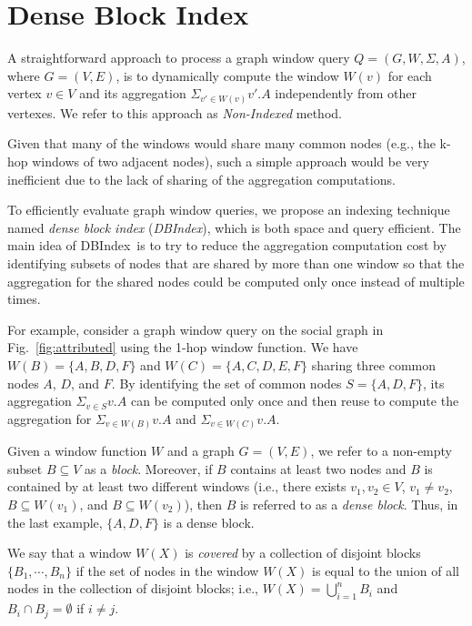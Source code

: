 
\newcommand{\DBIndex}{DBIndex}
\newcommand{\blockset}{{\cal B}}
\newcommand{\clusterset}{{\cal C}}

\section{Dense Block Index}
A straightforward approach to process a graph window query 
$Q = (G, W, \Sigma, A)$, where $G = (V,E)$,
is to dynamically compute the window $W(v)$ for each vertex $v \in V$ and
its aggregation 
$\Sigma_{v' \in W(v)} v'.A$ 
independently from other vertexes. We refer to this approach as \emph{Non-Indexed} method.

Given that many of the windows would share many common nodes (e.g., the k-hop windows of two adjacent nodes),
such a simple approach would be very inefficient due to the lack of sharing of the aggregation computations. 

To efficiently evaluate graph window queries, we propose an indexing technique named \emph{dense block index} (\textit{\DBIndex}), which is both space and query efficient. 
The main idea of \DBIndex\ is to try to reduce the aggregation computation cost by identifying subsets of nodes that are shared by more than one window 
so that the aggregation for the shared nodes could be computed only once instead of multiple times.

For example, consider a graph window query on the social graph in Fig.~\ref{fig:attributed} using the 1-hop window function.
We have $W(B) = \{A,B,D,F\}$ and $W(C) = \{A,C,D,E,F\}$ sharing three common nodes $A$, $D$, and $F$.
By identifying the set of common nodes $S=\{A,D,F\}$, its aggregation 
$\Sigma_{v \in S} v.A$ can be computed only once
and then reuse to compute the aggregation for $\Sigma_{v \in W(B)} v.A$ and $\Sigma_{v \in W(C)} v.A$.

Given a window function $W$ and a graph $G=(V,E)$,
we refer to a non-empty subset $B \subseteq V$ as a {\it block}.
Moreover, if $B$ contains at least two nodes and $B$ is contained by at least two different windows
(i.e., there exists $v_1, v_2 \in V$, $v_1 \neq v_2$, $B \subseteq W(v_1)$, and $B \subseteq W(v_2)$),
then $B$ is referred to as a {\it dense block}.
Thus, in the last example, $\{A,D,F\}$ is a dense block.

We say that a window $W(X)$ is {\it covered} by a collection of disjoint blocks $\{B_1,\cdots,B_n\}$
if the set of nodes in the window $W(X)$ is equal to the union of all nodes in the collection of disjoint blocks;
i.e., $W(X) = \bigcup_{i=1}^{n} B_i$ and $B_i \cap B_j = \emptyset$ if $i \neq j$.

